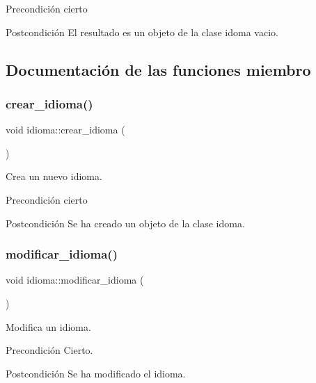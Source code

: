 \begin{DoxyPrecond}{Precondición}
cierto 
\end{DoxyPrecond}
\begin{DoxyPostcond}{Postcondición}
El resultado es un objeto de la clase idoma vacio. 
\end{DoxyPostcond}


\subsection{Documentación de las funciones miembro}
\mbox{\label{classidioma_a40b865628fe20757e63c10cecd516c1f}} 
\subsubsection{\texorpdfstring{crear\+\_\+idioma()}{crear\_idioma()}}
{\footnotesize\ttfamily void idioma\+::crear\+\_\+idioma (\begin{DoxyParamCaption}{ }\end{DoxyParamCaption})}



Crea un nuevo idioma. 

\begin{DoxyPrecond}{Precondición}
cierto 
\end{DoxyPrecond}
\begin{DoxyPostcond}{Postcondición}
Se ha creado un objeto de la clase idoma. 
\end{DoxyPostcond}
\mbox{\label{classidioma_af7d4b2d6a05e6b87783d9394fb1cc08e}} 
\subsubsection{\texorpdfstring{modificar\+\_\+idioma()}{modificar\_idioma()}}
{\footnotesize\ttfamily void idioma\+::modificar\+\_\+idioma (\begin{DoxyParamCaption}{ }\end{DoxyParamCaption})}



Modifica un idioma. 

\begin{DoxyPrecond}{Precondición}
Cierto. 
\end{DoxyPrecond}
\begin{DoxyPostcond}{Postcondición}
Se ha modificado el idioma. 
\end{DoxyPostcond}
\mbox{\label{classidioma_ab1f4f36cf5bef660d93208ca12a08d15}} 
